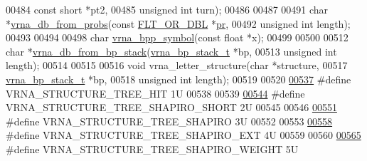 \begin{DoxyCode}
00484                                     \textcolor{keyword}{const} \textcolor{keywordtype}{short}   *pt2,
00485                                     \textcolor{keywordtype}{unsigned} \textcolor{keywordtype}{int}  turn);
00486 
00487 
00491 \textcolor{keywordtype}{char} *\hyperlink{group__struct__utils_ga0c28c410a5ab22d6ab9c77a84e8d5b44}{vrna\_db\_from\_probs}(\textcolor{keyword}{const} \hyperlink{group__data__structures_ga31125aeace516926bf7f251f759b6126}{FLT\_OR\_DBL} *\hyperlink{fold__vars_8h_ac98ec419070aee6831b44e5c700f090f}{pr},
00492                          \textcolor{keywordtype}{unsigned} \textcolor{keywordtype}{int}     length);
00493 
00494 
00498 \textcolor{keywordtype}{char} \hyperlink{group__struct__utils_ga025bff1b27fa46534c8fae6980f64bb5}{vrna\_bpp\_symbol}(\textcolor{keyword}{const} \textcolor{keywordtype}{float} *x);
00499 
00500 
00512 \textcolor{keywordtype}{char} *\hyperlink{group__struct__utils_ga27bea2c241564af53a065982183389df}{vrna\_db\_from\_bp\_stack}(\hyperlink{group__data__structures_structvrna__bp__stack__s}{vrna\_bp\_stack\_t} *bp,
00513                             \textcolor{keywordtype}{unsigned} \textcolor{keywordtype}{int}    length);
00514 
00515 
00516 \textcolor{keywordtype}{void} vrna\_letter\_structure(\textcolor{keywordtype}{char}             *structure,
00517                            \hyperlink{group__data__structures_structvrna__bp__stack__s}{vrna\_bp\_stack\_t}  *bp,
00518                            \textcolor{keywordtype}{unsigned} \textcolor{keywordtype}{int}     length);
00519 
00520 
\hyperlink{group__struct__utils__tree_ga3ad5609bc93ef20034c3ab989365c1f0}{00537} \textcolor{preprocessor}{#define   VRNA\_STRUCTURE\_TREE\_HIT             1U}
00538 
00539 
\hyperlink{group__struct__utils__tree_ga549e259a963d77e2d5b7e14083fc016e}{00544} \textcolor{preprocessor}{#define   VRNA\_STRUCTURE\_TREE\_SHAPIRO\_SHORT   2U}
00545 
00546 
\hyperlink{group__struct__utils__tree_ga4acd9991a0250ccd4cd44c4725b31927}{00551} \textcolor{preprocessor}{#define   VRNA\_STRUCTURE\_TREE\_SHAPIRO         3U}
00552 
00553 
\hyperlink{group__struct__utils__tree_ga8666a10982a4f7a26892066ff07b4b48}{00558} \textcolor{preprocessor}{#define   VRNA\_STRUCTURE\_TREE\_SHAPIRO\_EXT     4U}
00559 
00560 
\hyperlink{group__struct__utils__tree_ga91f2e3a3a502d5445fd7fe5983a5fe92}{00565} \textcolor{preprocessor}{#define   VRNA\_STRUCTURE\_TREE\_SHAPIRO\_WEIGHT  5U}

\end{DoxyCode}
